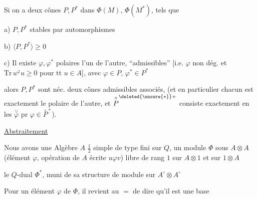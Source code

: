 Si on a deux cônes   $P,P^*$ dans
$\Phi(M)$, $\Phi(M^*)$,  tels que

a) $P,P^*$ stables par automorphismes

b) $\langle P,P^*\rangle\geq0$

c) Il existe $\varphi,\varphi^*$ polaires l'un de l'autre,
``admissibles'' [i.e.  $\varphi$ non dég. et
$\mathrm{Tr}\,u^\varphi u\geq0$ pour tt $u\in A$], avec $\varphi\in P$, $\varphi^*\in P^*$

alors $P,P^*$ sont néc. deux cônes admissibles
associés, (et en particulier chacun est
exactement le polaire de l'autre, et $\overset{\circ}{P}^{\deleted{\unsure{*}}+}$
consiste exactement en les $\overset{\vee}{\varphi}$ pr $\varphi\in\overset{\circ}{P}^+$).

\uline{Abstraitement}

Nous avons une Algèbre $A$ $\frac12$ simple de type fini sur $Q$,
un module  $\Phi$ sous $A\otimes A$ (élément $\varphi$,
opération de $A$ écrite $u\varphi v$)  libre
de rang $1$ sur $A\otimes1$ et sur $1\otimes A$

le  $Q$-dual $\Phi^*$,  muni de sa
structure de module sur $A^\circ\otimes A^\circ$

Pour un élément $\varphi$ de $\Phi$, il revient au $=$
de dire qu'il est une base 
